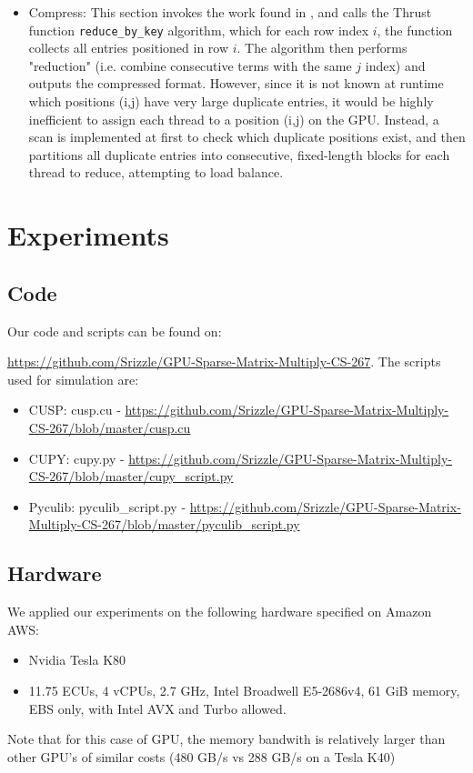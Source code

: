 \documentclass[12pt]{article}
\def\code#1{\texttt{#1}}
\begin{document}
\begin{itemize}
\item Compress: This section invokes the work found in \cite{multigrid}, and calls the Thrust function \code{reduce\_by\_key} algorithm, which for each row index $i$, the function collects all entries positioned in row $i$. The algorithm then performs "reduction" (i.e. combine consecutive terms with the same $j$ index) and outputs the compressed format. However, since it is not known at runtime which positions (i,j) have very large duplicate entries, it would be highly inefficient to assign each thread to a position (i,j) on the GPU. Instead, a scan is implemented at first to check which duplicate positions exist, and then partitions all duplicate entries into consecutive, fixed-length blocks for each thread to reduce, attempting to load balance. 
\end{itemize}



\section{Experiments}

\subsection{Code}
Our code and scripts can be found on:

\url{https://github.com/Srizzle/GPU-Sparse-Matrix-Multiply-CS-267}. The scripts used for simulation are: 
\begin{itemize}
\item CUSP: cusp.cu - \url{https://github.com/Srizzle/GPU-Sparse-Matrix-Multiply-CS-267/blob/master/cusp.cu}
\item CUPY: cupy.py - \url{https://github.com/Srizzle/GPU-Sparse-Matrix-Multiply-CS-267/blob/master/cupy_script.py}
\item Pyculib: pyculib\_script.py - \url{https://github.com/Srizzle/GPU-Sparse-Matrix-Multiply-CS-267/blob/master/pyculib_script.py}
\end{itemize}


\subsection{Hardware}
We applied our experiments on the following hardware specified on Amazon AWS:
\begin{itemize}
\item Nvidia Tesla K80 
\item 11.75 ECUs, 4 vCPUs, 2.7 GHz, Intel Broadwell E5-2686v4, 61 GiB memory, EBS only, with Intel AVX and Turbo allowed. 
\end{itemize}
Note that for this case of GPU, the memory bandwith is relatively larger than other GPU's of similar costs (480 GB/s vs 288 GB/s on a Tesla K40) 
\end{document}
